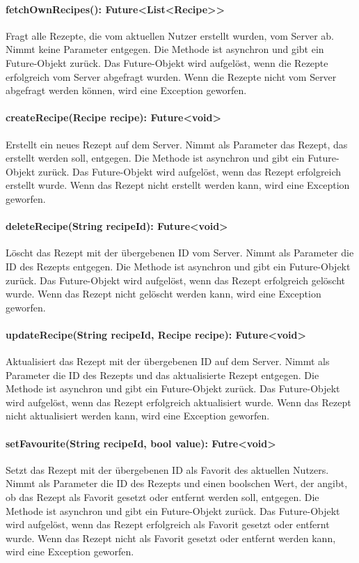 \documentclass[parskip=full]{scrartcl}
\begin{document}
\paragraph{fetchOwnRecipes(): Future<List<Recipe>>}
Fragt alle Rezepte, die vom aktuellen Nutzer erstellt wurden, vom Server ab. Nimmt keine Parameter entgegen. Die Methode ist asynchron und gibt ein Future-Objekt zurück. Das Future-Objekt wird aufgelöst, wenn die Rezepte erfolgreich vom Server abgefragt wurden. Wenn die Rezepte nicht vom Server abgefragt werden können, wird eine Exception geworfen.
\paragraph{createRecipe(Recipe recipe): Future<void>}
Erstellt ein neues Rezept auf dem Server. Nimmt als Parameter das Rezept, das erstellt werden soll, entgegen. Die Methode ist asynchron und gibt ein Future-Objekt zurück. Das Future-Objekt wird aufgelöst, wenn das Rezept erfolgreich erstellt wurde. Wenn das Rezept nicht erstellt werden kann, wird eine Exception geworfen.
\paragraph{deleteRecipe(String recipeId): Future<void>}
Löscht das Rezept mit der übergebenen ID vom Server. Nimmt als Parameter die ID des Rezepts entgegen. Die Methode ist asynchron und gibt ein Future-Objekt zurück. Das Future-Objekt wird aufgelöst, wenn das Rezept erfolgreich gelöscht wurde. Wenn das Rezept nicht gelöscht werden kann, wird eine Exception geworfen.
\paragraph{updateRecipe(String recipeId, Recipe recipe): Future<void>}
Aktualisiert das Rezept mit der übergebenen ID auf dem Server. Nimmt als Parameter die ID des Rezepts und das aktualisierte Rezept entgegen. Die Methode ist asynchron und gibt ein Future-Objekt zurück. Das Future-Objekt wird aufgelöst, wenn das Rezept erfolgreich aktualisiert wurde. Wenn das Rezept nicht aktualisiert werden kann, wird eine Exception geworfen.
\paragraph{setFavourite(String recipeId, bool value): Futre<void>}
Setzt das Rezept mit der übergebenen ID als Favorit des aktuellen Nutzers. Nimmt als Parameter die ID des Rezepts und einen boolschen Wert, der angibt, ob das Rezept als Favorit gesetzt oder entfernt werden soll, entgegen. Die Methode ist asynchron und gibt ein Future-Objekt zurück. Das Future-Objekt wird aufgelöst, wenn das Rezept erfolgreich als Favorit gesetzt oder entfernt wurde. Wenn das Rezept nicht als Favorit gesetzt oder entfernt werden kann, wird eine Exception geworfen.
\end{document}
